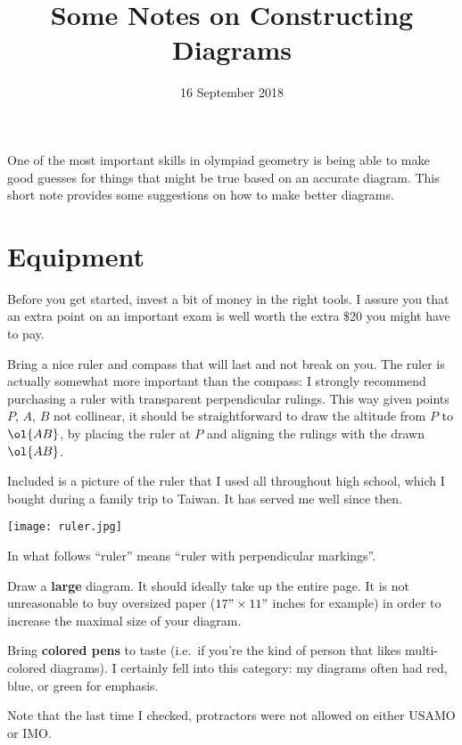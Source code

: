 \documentclass[11pt]{scrartcl}
\begin{document}
\title{Some Notes on Constructing Diagrams}
\date{16 September 2018}
\maketitle

One of the most important skills in olympiad geometry is being
able to make good guesses for things that might be true based
on an accurate diagram.
This short note provides some suggestions on how to make better diagrams.

\section{Equipment}
Before you get started, invest a bit of money in the right tools.
I assure you that an extra point on an important exam is well worth the extra \$20
you might have to pay.

\begin{itemize}
  \ii Bring a nice ruler and compass that will last and not break on you.
  The ruler is actually somewhat more important than the compass:
  I strongly recommend purchasing a ruler with transparent perpendicular rulings.
  This way given points $P$, $A$, $B$ not collinear,
  it should be straightforward to draw the altitude from $P$ to $\ol{AB}$,
  by placing the ruler at $P$ and aligning the rulings with the drawn $\ol{AB}$.

  Included is a picture of the ruler that I used all throughout high school,
  which I bought during a family trip to Taiwan. It has served me well since then.
  \begin{center}
    \texttt{[image: ruler.jpg]}
  \end{center}

  In what follows ``ruler'' means ``ruler with perpendicular markings''.

  \ii Draw a \textbf{large} diagram.
  It should ideally take up the entire page.
  It is not unreasonable to buy oversized paper
  ($17" \times 11"$ inches for example)
  in order to increase the maximal size of your diagram.

  \ii Bring \textbf{colored pens} to taste
  (i.e.\ if you're the kind of person that likes multi-colored diagrams).
  I certainly fell into this category:
  my diagrams often had red, blue, or green for emphasis.

\end{itemize}
Note that the last time I checked,
protractors were not allowed on either USAMO or IMO.
\end{document}
